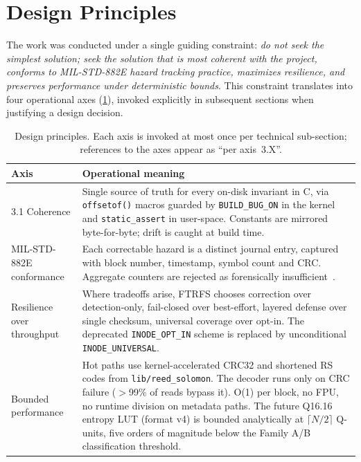 \section{Design Principles}\label{sec:principles}

The work was conducted under a single guiding constraint: \emph{do
not seek the simplest solution; seek the solution that is most
coherent with the project, conforms to MIL-STD-882E hazard
tracking practice, maximizes resilience, and preserves performance
under deterministic bounds}. This constraint translates into four
operational axes (\cref{tab:axes}), invoked explicitly in
subsequent sections when justifying a design decision.

\begin{table}[t]
\centering
\small
\caption{Design principles. Each axis is invoked at most once per
technical sub-section; references to the axes appear as
``per axis~3.X''.}
\label{tab:axes}
\begin{tabularx}{\textwidth}{p{2.6cm}X}
\toprule
\textbf{Axis} & \textbf{Operational meaning} \\
\midrule
3.1 Coherence
  & Single source of truth for every on-disk invariant in C, via
    \texttt{offsetof()} macros guarded by \texttt{BUILD\_BUG\_ON}
    in the kernel and \texttt{static\_assert} in user-space.
    Constants are mirrored byte-for-byte; drift is caught at
    build time. \\
\addlinespace[0.3em]
3.2 MIL-STD-882E conformance
  & Each correctable hazard is a distinct journal entry, captured
    with block number, timestamp, symbol count and CRC.
    Aggregate counters are rejected as
    forensically insufficient~\cite{milstd882e}. \\
\addlinespace[0.3em]
3.3 Resilience over throughput
  & Where tradeoffs arise, FTRFS chooses correction over
    detection-only, fail-closed over best-effort, layered defense
    over single checksum, universal coverage over opt-in. The
    deprecated \texttt{INODE\_OPT\_IN} scheme is replaced by
    unconditional \texttt{INODE\_UNIVERSAL}. \\
\addlinespace[0.3em]
3.4 Bounded performance
  & Hot paths use kernel-accelerated CRC32 and shortened RS codes
    from \texttt{lib/reed\_solomon}. The decoder runs only on
    CRC failure ($>$99\% of reads bypass it). O(1) per block, no
    FPU, no runtime division on metadata paths. The future
    Q16.16 entropy LUT (format v4) is bounded analytically at
    $\lceil N/2 \rceil$ Q-units, five orders of magnitude below
    the Family A/B classification threshold. \\
\bottomrule
\end{tabularx}
\end{table}
